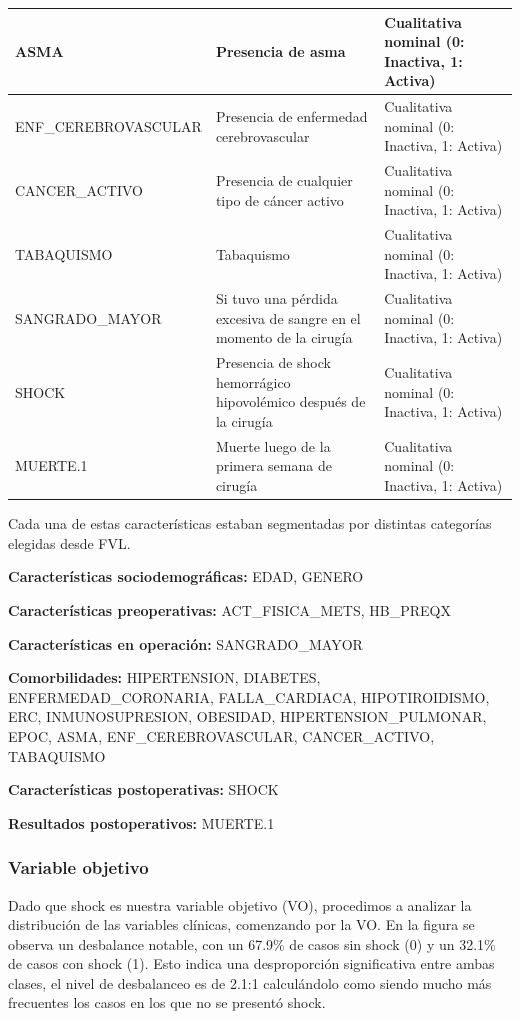 \begin{center}
\begin{xltabular}{\textwidth}{|>{\raggedright\arraybackslash}p{5cm}|>{\raggedright\arraybackslash}X|>{\raggedright\arraybackslash}p{4cm}|}
ASMA & Presencia de asma & Cualitativa nominal (0: Inactiva, 1: Activa) \\ \hline
ENF\_CEREBROVASCULAR & Presencia de enfermedad cerebrovascular & Cualitativa nominal (0: Inactiva, 1: Activa) \\ \hline
CANCER\_ACTIVO & Presencia de cualquier tipo de cáncer activo & Cualitativa nominal (0: Inactiva, 1: Activa) \\ \hline
TABAQUISMO & Tabaquismo & Cualitativa nominal (0: Inactiva, 1: Activa) \\ \hline
SANGRADO\_MAYOR & Si tuvo una pérdida excesiva de sangre en el momento de la cirugía & Cualitativa nominal (0: Inactiva, 1: Activa) \\ \hline
SHOCK & Presencia de shock hemorrágico hipovolémico después de la cirugía & Cualitativa nominal (0: Inactiva, 1: Activa) \\ \hline
MUERTE.1 & Muerte luego de la primera semana de cirugía & Cualitativa nominal (0: Inactiva, 1: Activa) \\ \hline
\end{xltabular}
\end{center}

Cada una de estas características estaban segmentadas por distintas categorías elegidas desde FVL.

\textbf{Características sociodemográficas:} EDAD, GENERO

\textbf{Características preoperativas:} ACT\_FISICA\_METS, HB\_PREQX

\textbf{Características en operación:} SANGRADO\_MAYOR

\textbf{Comorbilidades:} HIPERTENSION, DIABETES, ENFERMEDAD\_CORONARIA, FALLA\_CARDIACA, HIPOTIROIDISMO, ERC, INMUNOSUPRESION, OBESIDAD, HIPERTENSION\_PULMONAR, EPOC, ASMA, ENF\_CEREBROVASCULAR, CANCER\_ACTIVO, TABAQUISMO

\textbf{Características postoperativas:} SHOCK

\textbf{Resultados postoperativos:} MUERTE.1

\subsubsection{Variable objetivo}

Dado que shock es nuestra variable objetivo (VO), procedimos a analizar la distribución de las variables clínicas, comenzando por la VO. En la figura se observa un desbalance notable, con un 67.9\% de casos sin shock (0) y un 32.1\% de casos con shock (1). Esto indica una desproporción significativa entre ambas clases, el nivel de desbalanceo es de 2.1:1 calculándolo como siendo mucho más frecuentes los casos en los que no se presentó shock.

